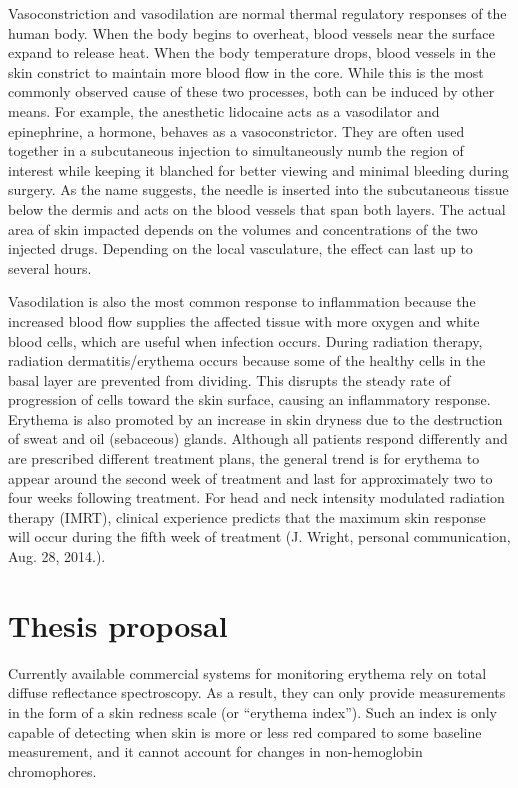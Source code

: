 Vasoconstriction and vasodilation are normal thermal regulatory responses of the human body.\cite{Kellogg2012} When the body begins to overheat, blood vessels near the surface expand to release heat. When the body temperature drops, blood vessels in the skin constrict to maintain more blood flow in the core. While this is the most commonly observed cause of these two processes, both can be induced by other means. For example, the anesthetic lidocaine acts as a vasodilator and epinephrine, a hormone, behaves as a vasoconstrictor. They are often used together in a subcutaneous injection to simultaneously numb the region of interest while keeping it blanched for better viewing and minimal bleeding during surgery. As the name suggests, the needle is inserted into the subcutaneous tissue below the dermis and acts on the blood vessels that span both layers. The actual area of skin impacted depends on the volumes and concentrations of the two injected drugs. Depending on the local vasculature, the effect can last up to several hours.

Vasodilation is also the most common response to inflammation because the increased blood flow supplies the affected tissue with more oxygen and white blood cells, which are useful when infection occurs. During radiation therapy, radiation dermatitis/erythema occurs because some of the healthy cells in the basal layer are prevented from dividing.\cite{Fitzgerald2008} This disrupts the steady rate of progression of cells toward the skin surface, causing an inflammatory response.\cite{Simonen1998} Erythema is also promoted by an increase in skin dryness due to the destruction of sweat and oil (sebaceous) glands. Although all patients respond differently and are prescribed different treatment plans, the general trend is for erythema to appear around the second week of treatment and last for approximately two to four weeks following treatment. For head and neck intensity modulated radiation therapy (IMRT), clinical experience predicts that the maximum skin response will occur during the fifth week of treatment (J. Wright, personal communication, Aug. 28, 2014.).

\section{Thesis proposal}
Currently available commercial systems for monitoring erythema rely on total diffuse reflectance spectroscopy.\cite{Clarys2000} As a result, they can only provide measurements in the form of a skin redness scale (or ``erythema index''). Such an index is only capable of detecting when skin is more or less red compared to some baseline measurement, and it cannot account for changes in non-hemoglobin chromophores.

